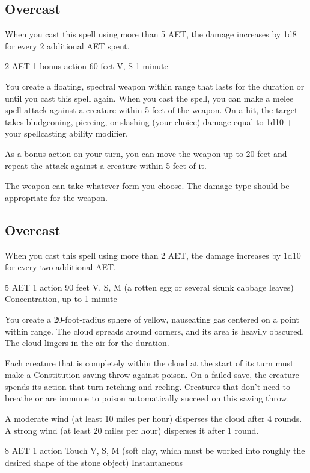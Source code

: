 \subsection*{Overcast} When you cast this spell using more than 5 AET, the damage increases by 1d8 for every 2 additional AET spent.

\label{spel:spiritual-weapon}
{2 AET}
{1 bonus action}
{60 feet}
{V, S}
{1 minute}

You create a floating, spectral weapon within range that lasts for the duration or until you cast this spell again. When you cast the spell, you can make a melee spell attack against a creature within 5 feet of the weapon. On a hit, the target takes bludgeoning, piercing, or slashing (your choice) damage equal to 1d10 + your spellcasting ability modifier.

As a bonus action on your turn, you can move the weapon up to 20 feet and repeat the attack against a creature within 5 feet of it.

The weapon can take whatever form you choose. The damage type should be appropriate for the weapon.

\subsection*{Overcast} When you cast this spell using more than 2 AET, the damage increases by 1d10 for every two additional AET.

\label{spell:stinking-cloud}
{5 AET}
{1 action}
{90 feet}
{V, S, M (a rotten egg or several skunk cabbage leaves)}
{Concentration, up to 1 minute}

You create a 20-foot-radius sphere of yellow, nauseating gas centered on a point within range. The cloud spreads around corners, and its area is heavily obscured. The cloud lingers in the air for the duration.

Each creature that is completely within the cloud at the start of its turn must make a Constitution saving throw against poison. On a failed save, the creature spends its action that turn retching and reeling. Creatures that don't need to breathe or are immune to poison automatically succeed on this saving throw.

A moderate wind (at least 10 miles per hour) disperses the cloud after 4 rounds. A strong wind (at least 20 miles per hour) disperses it after 1 round.

\label{spell:stone-shape}
{8 AET}
{1 action}
{Touch}
{V, S, M (soft clay, which must be worked into roughly the desired shape of the stone object)}
{Instantaneous}

